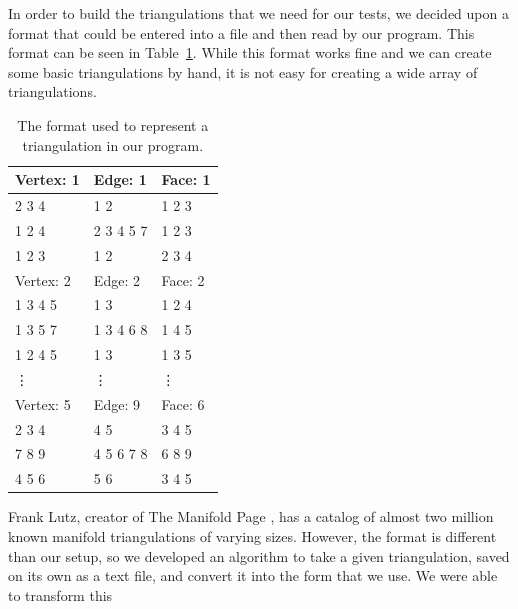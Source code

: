 \documentclass[12pt]{article}
\begin{document}
\noindent In order to build the triangulations that we need for our tests, we decided upon a format that could be entered into a file and then read by our program. This format can be seen in Table~\ref{tab:format}. While this format works fine and we can create some basic triangulations by hand, it is not easy for creating a wide array of triangulations.\newline

\begin{table}
\begin{center}
\begin{tabular}{|l|l|l|}
\hline
 Vertex: 1 &    Edge: 1 &    Face: 1 \\ \hline 

     2 3 4 &        1 2 &     1 2 3  \\

    1 2 4  & 2 3 4 5 7  &     1 2 3  \\

    1 2 3  &       1 2  &     2 3 4  \\ \hline 

 Vertex: 2 &    Edge: 2 &    Face: 2 \\ \hline

   1 3 4 5 &        1 3 &     1 2 4  \\

  1 3 5 7  & 1 3 4 6 8  &     1 4 5  \\

  1 2 4 5  &       1 3  &     1 3 5  \\ \hline 

 			\vdots & \vdots & \vdots \\ \hline 

 Vertex: 5 &    Edge: 9 &    Face: 6 \\ \hline

     2 3 4 &        4 5 &     3 4 5  \\

    7 8 9  & 4 5 6 7 8  &     6 8 9  \\

     4 5 6 &       5 6  &     3 4 5  \\
\hline
\end{tabular}
\end{center}
\caption{The format used to represent a triangulation in our program.}
\label{tab:format}
\end{table}

\noindent Frank Lutz, creator of The Manifold Page \cite{lutzmanifold}, has a catalog of almost two million known manifold triangulations of varying sizes. However, the format is different than our setup, so we developed an algorithm to take a given triangulation, saved on its own as a text file, and convert it into the form that we use. We were able to transform this
  
\end{document}
